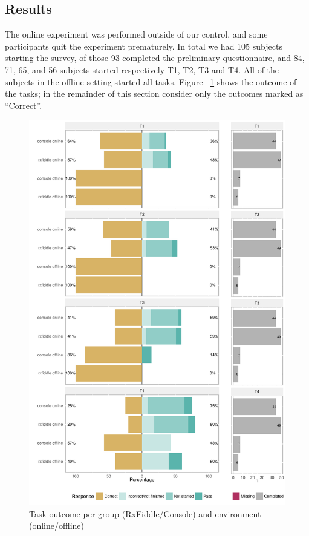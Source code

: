 \subsection{Results} The online experiment was performed outside of our
control, and some participants quit the experiment prematurely.  In
total we had 105 subjects starting the survey, of those 93 completed the
preliminary questionnaire, and 84, 71, 65, and 56 subjects started
respectively T1, T2, T3 and T4.  All of the subjects in the offline
setting started all tasks.  Figure~%
\ref{fig:resultPerTask} shows the outcome of the tasks; in the remainder
of this section consider only the outcomes marked as ``Correct''.

\begin{figure}[t]
    \includegraphics[width=\columnwidth]{images/resultPerTask.pdf}
    \caption{Task outcome per group (RxFiddle/Console) and environment (online/offline)}
    \label{fig:resultPerTask}
\end{figure}

